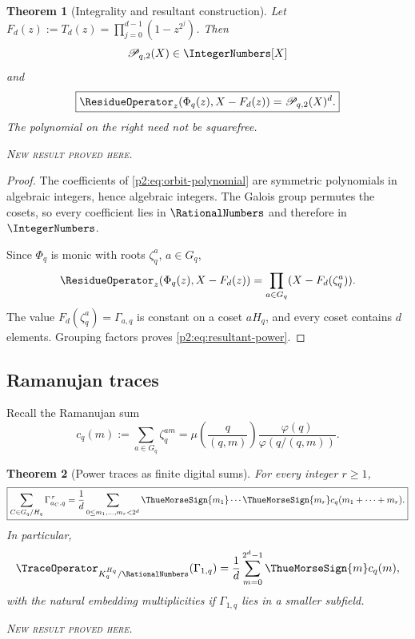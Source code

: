 \documentclass[11pt,oneside]{article}
\newtheorem{theorem}{Theorem}[section]
\theoremstyle{definition}
\theoremstyle{remark}
\newcommand{\newresult}{\textcolor{newgreen}{\textsc{New result proved here.}}}
\begin{document}
\begin{theorem}[Integrality and resultant construction]\label{p2:thm:orbit-resultant}
Let $F_d(z):=T_d(z)=\prod_{j=0}^{d-1}(1-z^{2^j})$. Then
\begin{equation}
 \mathscr P_{q,2}(X)\in\IntegerNumbers[X]
 \label{p2:eq:orbit-integral}
\end{equation}
and
\begin{equation}
 \boxed{
 \ResidueOperator_z\!\left(\Phi_q(z),X-F_d(z)\right)=\mathscr P_{q,2}(X)^d.}
 \label{p2:eq:resultant-power}
\end{equation}
The polynomial on the right need not be squarefree.

\smallskip\noindent\newresult
\end{theorem}

\begin{proof}
The coefficients of \eqref{p2:eq:orbit-polynomial} are symmetric polynomials in
algebraic integers, hence algebraic integers. The Galois group permutes the cosets,
so every coefficient lies in $\RationalNumbers$ and therefore in $\IntegerNumbers$.

Since $\Phi_q$ is monic with roots $\zeta_q^a$, $a\in G_q$,
\[
 \ResidueOperator_z(\Phi_q(z),X-F_d(z))
 =\prod_{a\in G_q}(X-F_d(\zeta_q^a)).
\]
The value $F_d(\zeta_q^a)=\Gamma_{a,q}$ is constant on a coset $aH_q$, and every
coset contains $d$ elements. Grouping factors proves \eqref{p2:eq:resultant-power}.
\end{proof}

\subsection{Ramanujan traces}

Recall the Ramanujan sum
\begin{equation}
 c_q(m):=\sum_{a\in G_q}\zeta_q^{am}
 =\mu\!\left(\frac{q}{(q,m)}\right)
 \frac{\varphi(q)}{\varphi(q/(q,m))}.
 \label{p2:eq:Ramanujan-sum}
\end{equation}

\begin{theorem}[Power traces as finite digital sums]\label{p2:thm:Ramanujan-traces}
For every integer $r\ge1$,
\begin{equation}
 \boxed{
 \sum_{C\in G_q/H_q}\Gamma_{a_C,q}^{\,r}
 =\frac1d\sum_{0\le m_1,\ldots,m_r<2^d}
 \ThueMorseSign{m_1}\cdots\ThueMorseSign{m_r}
 c_q(m_1+\cdots+m_r).}
 \label{p2:eq:power-trace}
\end{equation}
In particular,
\begin{equation}
 \TraceOperator_{K_q^{H_q}/\RationalNumbers}(\Gamma_{1,q})
 =\frac1d\sum_{m=0}^{2^d-1}\ThueMorseSign{m}c_q(m),
 \label{p2:eq:first-trace}
\end{equation}
with the natural embedding multiplicities if $\Gamma_{1,q}$ lies in a smaller
subfield.

\smallskip\noindent\newresult
\end{theorem}
\end{document}
